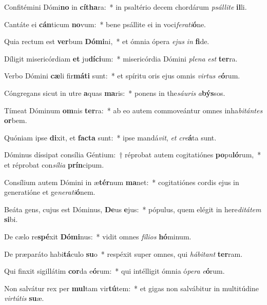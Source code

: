 \item Confitémini Dómi\textbf{no} in \textbf{cí}\textbf{tha}ra:~* in psaltério decem chordárum \textit{psál}\textit{li}\textit{te} \textbf{il}li.
\item Cantáte ei \textbf{cán}ticum \textbf{no}vum:~* bene psállite ei in voci\textit{fe}\textit{ra}\textit{ti}\textbf{ó}ne.
\item Quia rectum est \textbf{ver}bum \textbf{Dó}\textbf{mi}ni,~* et ómnia ópera \textit{e}\textit{jus} \textit{in} \textbf{fi}de.
\item Díligit misericórdiam \textbf{et} ju\textbf{dí}\textbf{ci}um:~* misericórdia Dómini \textit{ple}\textit{na} \textit{est} \textbf{ter}ra.
\item Verbo Dómini \textbf{cæ}li fir\textbf{má}\textbf{ti} sunt:~* et spíritu oris ejus omnis \textit{vir}\textit{tus} \textit{e}\textbf{ó}rum.
\item Cóngregans sicut in utre \textbf{a}quas \textbf{ma}ris:~* ponens in the\textit{sáu}\textit{ris} \textit{a}\textbf{býs}sos.
\item Tímeat Dóminum \textbf{om}nis \textbf{ter}ra:~* ab eo autem commoveántur omnes inha\textit{bi}\textit{tán}\textit{tes} \textbf{or}bem.
\item Quóniam ipse \textbf{di}xit, et \textbf{fac}\textbf{ta} sunt:~* ipse mandá\textit{vit}, \textit{et} \textit{cre}\textbf{á}ta sunt.
\item Dóminus díssipat consília Géntium:~† réprobat autem cogitatiónes \textbf{po}pu\textbf{ló}rum,~* et réprobat con\textit{sí}\textit{li}\textit{a} \textbf{prín}cipum.
\item Consílium autem Dómini in æ\textbf{tér}num \textbf{ma}net:~* cogitatiónes cordis ejus in generatióne et ge\textit{ne}\textit{ra}\textit{ti}\textbf{ó}nem.
\item Beáta gens, cujus est Dóminus, \textbf{De}us \textbf{e}jus:~* pópulus, quem elégit in here\textit{di}\textit{tá}\textit{tem} \textbf{si}bi.
\item De cælo re\textbf{spé}xit \textbf{Dó}\textbf{mi}nus:~* vidit omnes \textit{fí}\textit{li}\textit{os} \textbf{hó}minum.
\item De præparáto habi\textbf{tá}culo \textbf{su}o~* respéxit super omnes, qui \textit{há}\textit{bi}\textit{tant} \textbf{ter}ram.
\item Qui finxit sigillátim \textbf{cor}da e\textbf{ó}rum:~* qui intélligit ómnia ó\textit{pe}\textit{ra} \textit{e}\textbf{ó}rum.
\item Non salvátur rex per \textbf{mul}tam vir\textbf{tú}tem:~* et gigas non salvábitur in multitúdine \textit{vir}\textit{tú}\textit{tis} \textbf{su}æ.
